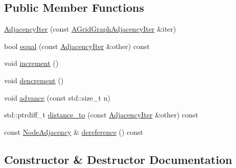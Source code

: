 \subsection*{Public Member Functions}
\begin{DoxyCompactItemize}
\item 
\hyperlink{classnifty_1_1graph_1_1detail__graph_1_1UndirectedGridGraphIter_1_1AdjacencyIter_a45cfeba6901be7c013bfbd4b2f1fe99e}{Adjacency\+Iter} (const \hyperlink{classnifty_1_1graph_1_1detail__graph_1_1UndirectedGridGraphIter_a824924927d819949af2370aa628af595}{A\+Grid\+Graph\+Adjacency\+Iter} \&iter)
\item 
bool \hyperlink{classnifty_1_1graph_1_1detail__graph_1_1UndirectedGridGraphIter_1_1AdjacencyIter_a7f55cdc0ac39b213ceb202f496cf8ec3}{equal} (const \hyperlink{classnifty_1_1graph_1_1detail__graph_1_1UndirectedGridGraphIter_1_1AdjacencyIter}{Adjacency\+Iter} \&other) const
\item 
void \hyperlink{classnifty_1_1graph_1_1detail__graph_1_1UndirectedGridGraphIter_1_1AdjacencyIter_ad6a4c23c77e26cd510a5e123eb39ad8e}{increment} ()
\item 
void \hyperlink{classnifty_1_1graph_1_1detail__graph_1_1UndirectedGridGraphIter_1_1AdjacencyIter_a8703126f4b9dd746d511980501bc8a51}{dencrement} ()
\item 
void \hyperlink{classnifty_1_1graph_1_1detail__graph_1_1UndirectedGridGraphIter_1_1AdjacencyIter_aea682eb4075c5a9f29e78aa27db56df1}{advance} (const std\+::size\+\_\+t n)
\item 
std\+::ptrdiff\+\_\+t \hyperlink{classnifty_1_1graph_1_1detail__graph_1_1UndirectedGridGraphIter_1_1AdjacencyIter_a0c0da4fe12cc98b319b357d50b89951d}{distance\+\_\+to} (const \hyperlink{classnifty_1_1graph_1_1detail__graph_1_1UndirectedGridGraphIter_1_1AdjacencyIter}{Adjacency\+Iter} \&other) const
\item 
const \hyperlink{classnifty_1_1graph_1_1detail__graph_1_1UndirectedGridGraphIter_ab102d464df39aae71f7482baa37d8966}{Node\+Adjacency} \& \hyperlink{classnifty_1_1graph_1_1detail__graph_1_1UndirectedGridGraphIter_1_1AdjacencyIter_a2163ccecdb8b5ca962e1ce32b96802d6}{dereference} () const
\end{DoxyCompactItemize}


\subsection{Constructor \& Destructor Documentation}
\mbox{\label{classnifty_1_1graph_1_1detail__graph_1_1UndirectedGridGraphIter_1_1AdjacencyIter_a45cfeba6901be7c013bfbd4b2f1fe99e}} 
